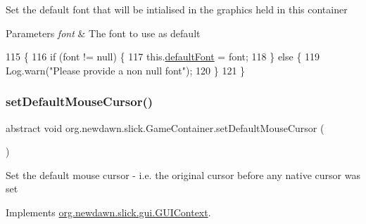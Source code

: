 Set the default font that will be intialised in the graphics held in this container


\begin{DoxyParams}{Parameters}
{\em font} & The font to use as default \\
\hline
\end{DoxyParams}

\begin{DoxyCode}
115                                           \{
116         \textcolor{keywordflow}{if} (font != null) \{
117             this.\mbox{\hyperlink{classorg_1_1newdawn_1_1slick_1_1_game_container_a42d2acd12fa335270fdea3fd9d739d55}{defaultFont}} = font;
118         \} \textcolor{keywordflow}{else} \{
119             Log.warn(\textcolor{stringliteral}{"Please provide a non null font"});
120         \}
121     \}
\end{DoxyCode}
\mbox{\label{classorg_1_1newdawn_1_1slick_1_1_game_container_aafbac3cb7c8bb30af0bcafa4b86e33a0}} 
\subsubsection{\texorpdfstring{set\+Default\+Mouse\+Cursor()}{setDefaultMouseCursor()}}
{\footnotesize\ttfamily abstract void org.\+newdawn.\+slick.\+Game\+Container.\+set\+Default\+Mouse\+Cursor (\begin{DoxyParamCaption}{ }\end{DoxyParamCaption})\hspace{0.3cm}{\ttfamily [abstract]}}

Set the default mouse cursor -\/ i.\+e. the original cursor before any native cursor was set 

Implements \mbox{\hyperlink{interfaceorg_1_1newdawn_1_1slick_1_1gui_1_1_g_u_i_context_a665c6e15e417418eccf462a1ec957b1a}{org.\+newdawn.\+slick.\+gui.\+G\+U\+I\+Context}}.

\mbox{\label{classorg_1_1newdawn_1_1slick_1_1_game_container_af7539008df0bf3bb0e11a16173abe524}} 
